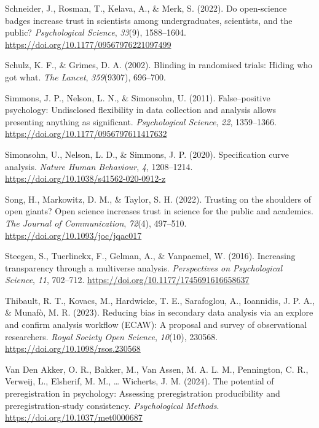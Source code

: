 \documentclass[
  english,
  man,floatsintext]{apa6}
\newlength{\cslhangindent}
\newenvironment{CSLReferences}[2] %
 {\begin{list}{}{%
  \setlength{\itemindent}{0pt}
  \setlength{\leftmargin}{0pt}
  \setlength{\parsep}{0pt}
  \ifodd #1
   \setlength{\leftmargin}{\cslhangindent}
   \setlength{\itemindent}{-1\cslhangindent}
  \fi
  \setlength{\itemsep}{#2\baselineskip}}}
 {\end{list}}
\begin{document}
\begin{CSLReferences}{1}{0}
Schneider, J., Rosman, T., Kelava, A., \& Merk, S. (2022). Do open-science badges increase trust in scientists among undergraduates, scientists, and the public? \emph{Psychological Science}, \emph{33}(9), 1588--1604. \url{https://doi.org/10.1177/09567976221097499}

Schulz, K. F., \& Grimes, D. A. (2002). Blinding in randomised trials: {Hiding} who got what. \emph{The Lancet}, \emph{359}(9307), 696--700.

Simmons, J. P., Nelson, L. N., \& Simonsohn, U. (2011). False--positive psychology: {U}ndisclosed flexibility in data collection and analysis allows presenting anything as significant. \emph{Psychological Science}, \emph{22}, 1359--1366. \url{https://doi.org/10.1177/0956797611417632}

Simonsohn, U., Nelson, L. D., \& Simmons, J. P. (2020). Specification curve analysis. \emph{Nature Human Behaviour}, \emph{4}, 1208--1214. \url{https://doi.org/10.1038/s41562-020-0912-z}

Song, H., Markowitz, D. M., \& Taylor, S. H. (2022). Trusting on the shoulders of open giants? Open science increases trust in science for the public and academics. \emph{The Journal of Communication}, \emph{72}(4), 497--510. \url{https://doi.org/10.1093/joc/jqac017}

Steegen, S., Tuerlinckx, F., Gelman, A., \& Vanpaemel, W. (2016). Increasing transparency through a multiverse analysis. \emph{Perspectives on Psychological Science}, \emph{11}, 702--712. \url{https://doi.org/10.1177/1745691616658637}

Thibault, R. T., Kovacs, M., Hardwicke, T. E., Sarafoglou, A., Ioannidis, J. P. A., \& Munafò, M. R. (2023). Reducing bias in secondary data analysis via an explore and confirm analysis workflow ({ECAW}): A proposal and survey of observational researchers. \emph{Royal Society Open Science}, \emph{10}(10), 230568. \url{https://doi.org/10.1098/rsos.230568}

Van Den Akker, O. R., Bakker, M., Van Assen, M. A. L. M., Pennington, C. R., Verweij, L., Elsherif, M. M., \ldots{} Wicherts, J. M. (2024). The potential of preregistration in psychology: {Assessing} preregistration producibility and preregistration-study consistency. \emph{Psychological Methods}. \url{https://doi.org/10.1037/met0000687}


\end{CSLReferences}
\end{document}
